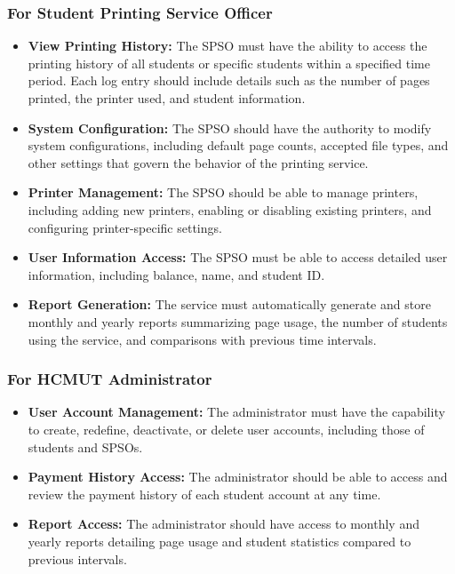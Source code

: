 \subsubsection{For Student Printing Service Officer}
\begin{itemize}
\item \textbf{View Printing History:} The SPSO must have the ability to access the printing history of all students or specific students within a specified time period. Each log entry should include details such as the number of pages printed, the printer used, and student information.
\item \textbf{System Configuration:} The SPSO should have the authority to modify system configurations, including default page counts, accepted file types, and other settings that govern the behavior of the printing service.
\item \textbf{Printer Management:} The SPSO should be able to manage printers, including adding new printers, enabling or disabling existing printers, and configuring printer-specific settings.
\item \textbf{User Information Access:} The SPSO must be able to access detailed user information, including balance, name, and student ID.
\item \textbf{Report Generation:} The service must automatically generate and store monthly and yearly reports summarizing page usage, the number of students using the service, and comparisons with previous time intervals.
\end{itemize}

\subsubsection{For HCMUT Administrator}
\begin{itemize}
\item \textbf{User Account Management:} The administrator must have the capability to create, redefine, deactivate, or delete user accounts, including those of students and SPSOs.
\item \textbf{Payment History Access:} The administrator should be able to access and review the payment history of each student account at any time.
\item \textbf{Report Access:} The administrator should have access to monthly and yearly reports detailing page usage and student statistics compared to previous intervals.
\end{itemize}

